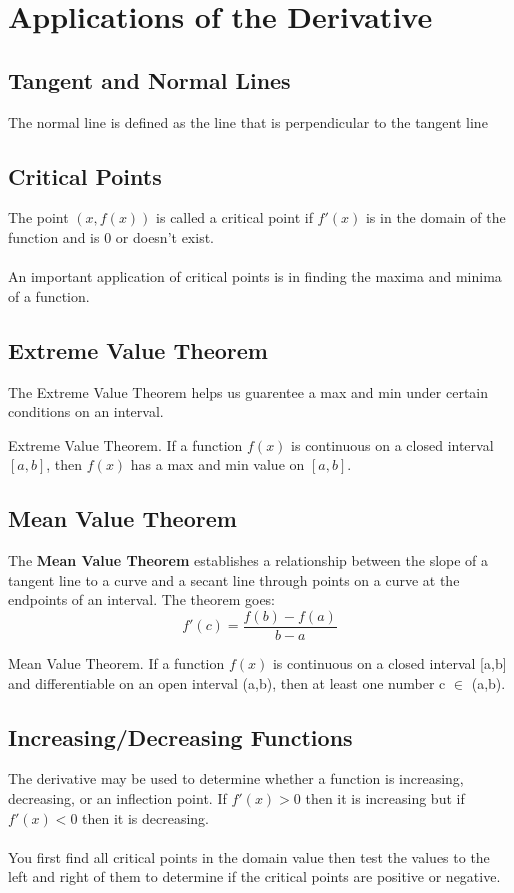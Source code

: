 \chapter{Applications of the Derivative}

\section{Tangent and Normal Lines}
The normal line is defined as the line that is perpendicular to the tangent line

\section{Critical Points}
The point $(x, f(x))$ is called a critical point if $f'(x)$ is in the domain of the function and is 0 or doesn't exist. \\
\\
An important application of critical points is in finding the maxima and minima of a function.

\section{Extreme Value Theorem}
The Extreme Value Theorem helps us guarentee a max and min under certain conditions on an interval.
\\
\begin{mybox}{Extreme Value Theorem.}
  If a function $f(x)$ is continuous on a closed interval $[a,b]$, 
  then $f(x)$ has a max and min value on $[a,b]$.
\end{mybox}

\section{Mean Value Theorem}
The \textbf{Mean Value Theorem} establishes a relationship between the slope of a tangent line to a curve and a secant line through points on a curve at the endpoints of an interval. The theorem goes:
\[
f'(c) = \frac{f(b) - f(a)}{b - a}
\] 
\begin{mybox}{Mean Value Theorem.}
	If a function $f(x)$ is continuous on a closed interval [a,b] and differentiable on an open interval (a,b), then at least one number c $\in$ (a,b).
\end{mybox}

\section{Increasing/Decreasing Functions}
The derivative may be used to determine whether a function is increasing, decreasing, or an inflection point. If $f'(x) > 0$ then it is increasing but if $f'(x) < 0$ then it is decreasing.\\
\\
You first find all critical points in the domain value then test the values to the left and right of them to determine if the critical points are positive or negative.

